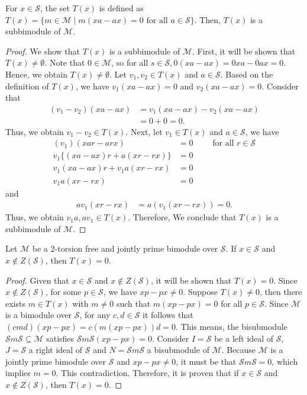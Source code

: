 \documentclass{arxiv}
\begin{document}
\begin{lemma}\label{lemma3.3.10}
    For $x \in \mathcal{S}$, the set $T(x)$ is defined as $T(x) = \{ m \in \mathcal{M} \mid m(xa-ax)=0 \text{ for all } a \in \mathcal{S} \}$. Then, $T(x)$ is a subbimodule of $\mathcal{M}$.
\end{lemma}
\begin{proof}
   We show that $T(x)$ is a subbimodule of $\mathcal{M}$. First, it will be shown that $T(x) \neq  \emptyset$. Note that $0 \in \mathcal{M}$, so for all $s \in \mathcal{S},0(xa-ax)=0xa-0ax=0$. Hence, we obtain $T(x)  \neq \emptyset.$  Let $v_1,v_2 \in T(x)$ and $a \in \mathcal{S}$. Based on the definition of $T(x)$, we have $v_1(xa-ax)=0$ and $v_2(xa-ax)=0$. Consider that
    \begin{align*}
       (v_1-v_2)(xa-ax) &=  v_1 (xa-ax)-v_2(xa-ax) \\
        & = 0+0 =0.
    \end{align*}
    Thus, we obtain $v_1-v_2 \in T(x)$. Next, let $v_1 \in T(x)$ and $a \in \mathcal{S}$, we have
    \begin{align*}
        (v_1)(xar-arx) &= 0 \quad \quad \text{ for all } r \in \mathcal{S}\\
        v_1 \{ (xa-ax)r+a(xr-rx)\} & = 0\\
        v_1(xa-ax)r +v_1a(xr-rx) &= 0\\
        v_1a(xr-rx) &= 0
    \end{align*}
    and
    \begin{align*}
        av_1(xr-rx) &= a(v_1(xr-rx))=0.
    \end{align*}
    Thus, we obtain $v_1a, av_1\in T(x)$. Therefore, We conclude that $T(x)$ is a subbimodule of $\mathcal{M}$.
\end{proof}

\begin{lemma}\label{lemma3.3.11}
     Let $\mathcal{M}$ be a $2$-torsion free and jointly prime bimodule over $\mathcal{S}$. If $x \in \mathcal{S}$ and $x \notin Z(\mathcal{S})$, then $T(x) =0$.
\end{lemma}
\begin{proof}
    Given that $x \in \mathcal{S}$ and $x \notin Z(\mathcal{S})$, it will be shown that $T(x)=0$. Since $x \notin Z(\mathcal{S})$, for some $p \in \mathcal{S}$, we have $xp-px \ne 0$. Suppose $T(x) \ne 0$, then there exists $m \in T(x)$ with $m \ne 0$ such that $m(xp-px)=0$ for all $p \in \mathcal{S}$. Since $\mathcal{M}$ is a bimodule over $\mathcal{S}$, for any $c,d \in \mathcal{S}$ it follows that $(cmd)(xp-px)=c(m(xp-px))d=0$. This means, the bisubmodule $\mathcal{S}m\mathcal{S} \subseteq \mathcal{M}$ satisfies $\mathcal{S}m\mathcal{S} (xp-px)=0$. Consider $I=\mathcal{S}$ be a left ideal  of $\mathcal{S}$, $J=\mathcal{S}$ a right ideal of $\mathcal{S}$ and $N=\mathcal{S}m\mathcal{S}$ a bisubmodule of $\mathcal{M}$. Because $\mathcal{M}$ is a jointly prime bimodule over $\mathcal{S}$ and $xp-px\ne 0$, it must be that $\mathcal{S}m\mathcal{S} = 0$, which implies $m =0$. This contradiction. Therefore, it is proven that if $x \in \mathcal{S}$ and $x \notin Z(\mathcal{S})$, then $T(x)=0$.
\end{proof}
\end{document}
